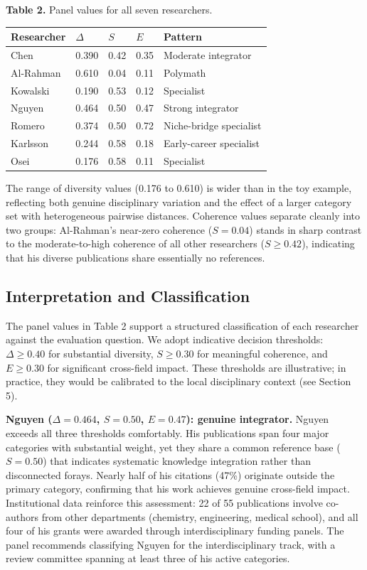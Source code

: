 \documentclass[
]{article}
\begin{document}
\textbf{Table 2.} Panel values for all seven researchers.

\begin{longtable}[]{@{}lllll@{}}
\toprule
Researcher & \(\Delta\) & \(S\) & \(E\) & Pattern \\
\midrule
\endhead
Chen & 0.390 & 0.42 & 0.35 & Moderate integrator \\
Al-Rahman & 0.610 & 0.04 & 0.11 & Polymath \\
Kowalski & 0.190 & 0.53 & 0.12 & Specialist \\
Nguyen & 0.464 & 0.50 & 0.47 & Strong integrator \\
Romero & 0.374 & 0.50 & 0.72 & Niche-bridge specialist \\
Karlsson & 0.244 & 0.58 & 0.18 & Early-career specialist \\
Osei & 0.176 & 0.58 & 0.11 & Specialist \\
\bottomrule
\end{longtable}

The range of diversity values (0.176 to 0.610) is wider than in the toy
example, reflecting both genuine disciplinary variation and the effect
of a larger category set with heterogeneous pairwise distances.
Coherence values separate cleanly into two groups: Al-Rahman's near-zero
coherence (\(S = 0.04\)) stands in sharp contrast to the
moderate-to-high coherence of all other researchers (\(S \geq 0.42\)),
indicating that his diverse publications share essentially no
references.

\hypertarget{interpretation-and-classification}{%
\subsection{Interpretation and
Classification}\label{interpretation-and-classification}}

The panel values in Table 2 support a structured classification of each
researcher against the evaluation question. We adopt indicative decision
thresholds: \(\Delta \geq 0.40\) for substantial diversity,
\(S \geq 0.30\) for meaningful coherence, and \(E \geq 0.30\) for
significant cross-field impact. These thresholds are illustrative; in
practice, they would be calibrated to the local disciplinary context
(see Section 5).

\textbf{Nguyen (\(\Delta = 0.464\), \(S = 0.50\), \(E = 0.47\)): genuine
integrator.} Nguyen exceeds all three thresholds comfortably. His
publications span four major categories with substantial weight, yet
they share a common reference base (\(S = 0.50\)) that indicates
systematic knowledge integration rather than disconnected forays. Nearly
half of his citations (47\%) originate outside the primary category,
confirming that his work achieves genuine cross-field impact.
Institutional data reinforce this assessment: 22 of 55 publications
involve co-authors from other departments (chemistry, engineering,
medical school), and all four of his grants were awarded through
interdisciplinary funding panels. The panel recommends classifying
Nguyen for the interdisciplinary track, with a review committee spanning
at least three of his active categories.
\end{document}
